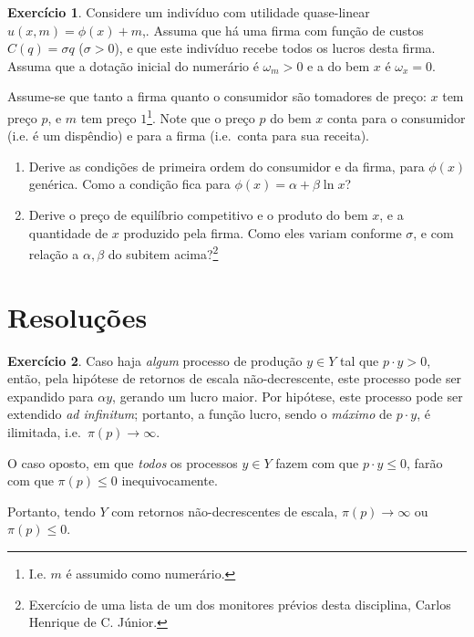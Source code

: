 \documentclass[12pt]{article}
\numberwithin{equation}{section}
\theoremstyle{plain}
\theoremstyle{definition}
\newtheorem{exercise}{Exercício}
\theoremstyle{remark}
\begin{document}
\begin{exercise}
Considere um indivíduo com utilidade quase-linear
\(u(x, m) = \phi(x) + m\),. Assuma que há uma firma com função de custos
\(C(q) = \sigma q\) (\(\sigma>0\)), e que este indivíduo recebe todos os
lucros desta firma. Assuma que a dotação inicial do numerário é
\(\omega_{m}>0\) e a do bem \(x\) é \(\omega_{x}=0\).

Assume-se que tanto a firma quanto o consumidor são tomadores de preço: \(x\) tem preço \(p\), e \(m\) tem preço \(1\)\footnote{I.e.
  \(m\) é assumido como numerário.}. Note que o preço \(p\) do bem \(x\)
conta para o consumidor (i.e. é um dispêndio) e para a firma (i.e.~conta
para sua receita).

\begin{enumerate}
\item
  Derive as condições de primeira ordem do consumidor e da firma, para
  \(\phi(x)\) genérica. Como a condição fica para
  \(\phi(x)=\alpha+\beta \ln x\)?
\item
  Derive o preço de equilíbrio competitivo e o produto do bem \(x\), e a
  quantidade de \(x\) produzido pela firma. Como eles variam conforme
  \(\sigma\), e com relação a \(\alpha,\beta\) do subitem
  acima?\footnote{Exercício de uma lista de um dos monitores prévios
    desta disciplina, Carlos Henrique de C. Júnior.}
\end{enumerate}
\end{exercise}

\hypertarget{resoluuxe7uxf5es}{%
\section{Resoluções}\label{resoluuxe7uxf5es}}
\setcounter{exercise}{0}

\begin{exercise}
Caso haja \textit{algum} processo de produção \(y \in Y\) tal que
\(p \cdot y > 0\), então, pela hipótese de retornos de escala
não-decrescente, este processo pode ser expandido para \(\alpha y\),
gerando um lucro maior. Por hipótese, este processo pode ser extendido
\textit{ad infinitum}; portanto, a função lucro, sendo o \textit{máximo}
de \(p\cdot y\), é ilimitada, i.e.~\(\pi(p)\to \infty\).

O caso oposto, em que \textit{todos} os processos \(y \in Y\) fazem com
que \(p \cdot y \leq 0\), farão com que \(\pi(p) \leq 0\)
inequivocamente.

Portanto, tendo \(Y\) com retornos não-decrescentes de escala,
\(\pi(p) \to \infty\) ou \(\pi(p) \leq 0\).
\end{exercise}
\end{document}
